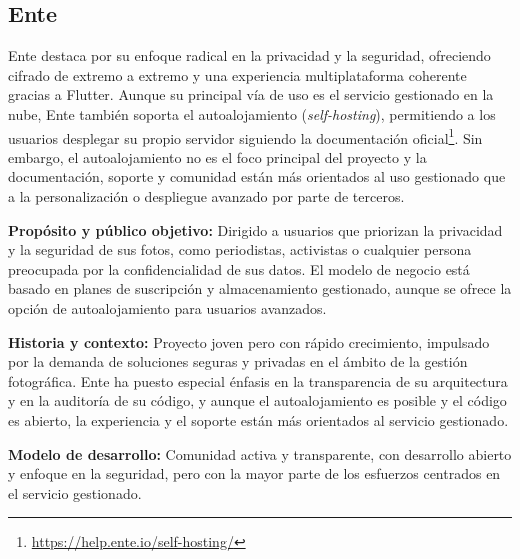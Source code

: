 
\subsection{Ente}

Ente destaca por su enfoque radical en la privacidad y la seguridad, ofreciendo cifrado de extremo a extremo y una experiencia multiplataforma coherente gracias a Flutter. Aunque su principal vía de uso es el servicio gestionado en la nube, Ente también soporta el autoalojamiento (\textit{self-hosting}), permitiendo a los usuarios desplegar su propio servidor siguiendo la documentación oficial\footnote{\url{https://help.ente.io/self-hosting/}}. Sin embargo, el autoalojamiento no es el foco principal del proyecto y la documentación, soporte y comunidad están más orientados al uso gestionado que a la personalización o despliegue avanzado por parte de terceros.

\textbf{Propósito y público objetivo:} Dirigido a usuarios que priorizan la privacidad y la seguridad de sus fotos, como periodistas, activistas o cualquier persona preocupada por la confidencialidad de sus datos. El modelo de negocio está basado en planes de suscripción y almacenamiento gestionado, aunque se ofrece la opción de autoalojamiento para usuarios avanzados.

\textbf{Historia y contexto:} Proyecto joven pero con rápido crecimiento, impulsado por la demanda de soluciones seguras y privadas en el ámbito de la gestión fotográfica. Ente ha puesto especial énfasis en la transparencia de su arquitectura y en la auditoría de su código, y aunque el autoalojamiento es posible y el código es abierto, la experiencia y el soporte están más orientados al servicio gestionado.

\textbf{Modelo de desarrollo:} Comunidad activa y transparente, con desarrollo abierto y enfoque en la seguridad, pero con la mayor parte de los esfuerzos centrados en el servicio gestionado.

